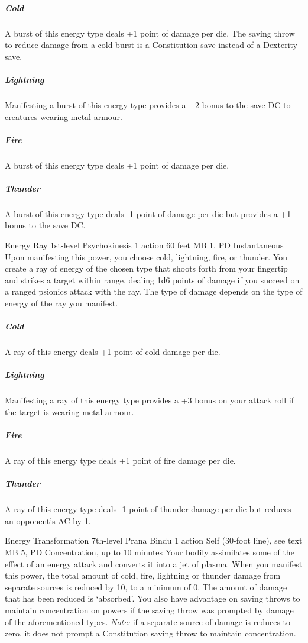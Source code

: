   \subparagraph{Cold}
  A burst of this energy type deals +1 point of damage per die.
  The saving throw to reduce damage from a cold burst
  is a Constitution save instead of a Dexterity save.
  
  \subparagraph{Lightning}
  Manifesting a burst of this energy type provides a +2 bonus
  to the save DC to creatures wearing metal armour.
  
  \subparagraph{Fire}
  A burst of this energy type deals +1 point of damage per die.
  
  \subparagraph{Thunder}
    A burst of this energy type deals -1 point of damage per die
    but provides a +1 bonus to the save DC.

\DndPowerHeader%
  {Energy Ray}
  {1st-level Psychokinesis}
  {1 action}
  {60 feet}
  {MB 1, PD \lvlone}
  {Instantaneous}
Upon manifesting this power,
you choose cold, lightning, fire, or thunder.
You create a ray of energy of the chosen type that
shoots forth from your fingertip and strikes a target within range,
dealing 1d6 points of damage if you succeed on a
ranged psionics attack with the ray.
The type of damage depends on
the type of energy of the ray you manifest. 
  \subparagraph{Cold}
    A ray of this energy deals +1 point of cold damage per die.
  \subparagraph{Lightning}
    Manifesting a ray of this energy type provides a
    +3 bonus on your attack roll if the target is wearing metal armour.
  \subparagraph{Fire}
    A ray of this energy type deals +1 point of fire damage per die.
  \subparagraph{Thunder}
    A ray of this energy type deals -1 point of thunder damage per die
    but reduces an opponent's AC by 1.

\DndPowerHeader%
  {Energy Transformation}
  {7th-level Prana Bindu}
  {1 action}
  {Self (30-foot line), see text}
  {MB 5, PD \lvlseven}
  {Concentration, up to 10 minutes}
  Your bodily assimilates some of the effect of an
  energy attack and converts it into a jet of plasma.
  When you manifest this power,
  the total amount of cold, fire,
  lightning or thunder damage
  from separate sources is reduced by 10,
  to a minimum of 0.
  The amount of damage that has been reduced
  is `absorbed'.
  You also have advantage on saving throws to
  maintain concentration on powers if the
  saving throw was prompted by damage of the
  aforementioned types.
  \emph{Note:} if a separate source of damage is
  reduces to zero, it does not prompt a Constitution
  saving throw to maintain concentration.
  
